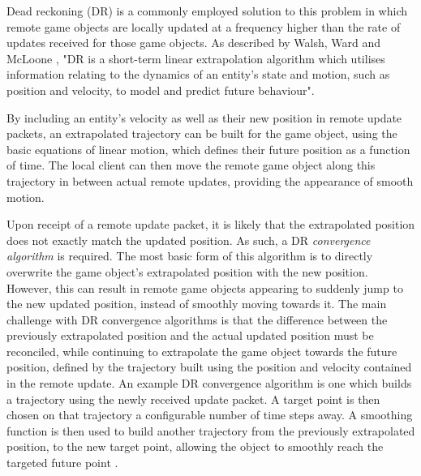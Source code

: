 Dead reckoning (DR) is a commonly employed solution to this problem in which remote game objects are locally updated at a frequency higher than the rate of updates received for those game objects. As described by Walsh, Ward and McLoone \cite{dead-reckoning}, "DR is a short-term linear extrapolation algorithm which utilises information relating to the dynamics of an entity’s state and motion, such as position and velocity, to model and predict future behaviour".

By including an entity's velocity as well as their new position in remote update packets, an extrapolated trajectory can be built for the game object, using the basic equations of linear motion, which defines their future position as a function of time. The local client can then move the remote game object along this trajectory in between actual remote updates, providing the appearance of smooth motion.   

Upon receipt of a remote update packet, it is likely that the extrapolated position does not exactly match the updated position. As such, a DR \textit{convergence algorithm} is required. The most basic form of this algorithm is to directly overwrite the game object's extrapolated position with the new position. However, this can result in remote game objects appearing to suddenly jump to the new updated position, instead of smoothly moving towards it. The main challenge with DR convergence algorithms is that the difference between the previously extrapolated position and the actual updated position must be reconciled, while continuing to extrapolate the game object towards the future position, defined by the trajectory built using the position and velocity contained in the remote update. An example DR convergence algorithm is one which builds a trajectory using the newly received update packet. A target point is then chosen on that trajectory a configurable number of time steps away. A smoothing function is then used to build another trajectory from the previously extrapolated position, to the new target point, allowing the object to smoothly reach the targeted future point \cite{dead-reckoning-convergence}.  

